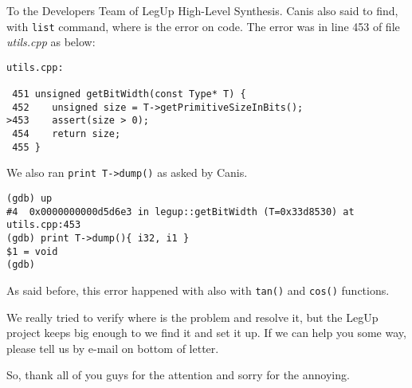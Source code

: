 \documentclass[11pt]{letter}
\begin{document}
\begin{letter}{To the Developers Team of LegUp High-Level Synthesis.}
Canis also said to find, with \texttt{list} command, where is the error on code. The error was in line 453 of file \textit{utils.cpp} as below:

{ \tiny
\begin{verbatim}
utils.cpp:

 451 unsigned getBitWidth(const Type* T) {
 452    unsigned size = T->getPrimitiveSizeInBits();
>453    assert(size > 0);
 454    return size;
 455 }
\end{verbatim}
}

We also ran \texttt{print T->dump()} as asked by Canis.

{ \footnotesize
\begin{verbatim}
(gdb) up
#4  0x0000000000d5d6e3 in legup::getBitWidth (T=0x33d8530) at utils.cpp:453
(gdb) print T->dump(){ i32, i1 }
$1 = void
(gdb)
\end{verbatim}
}

As said before, this error happened with also with \texttt{tan()} and \texttt{cos()} functions.

We really tried to verify where is the problem and resolve it, but the LegUp project keeps big enough to we find it and set it up.
If we can help you some way, please tell us by e-mail on bottom of letter.

\closing{So, thank all of you guys for the attention and sorry for the annoying.}
\end{letter}
\end{document}

